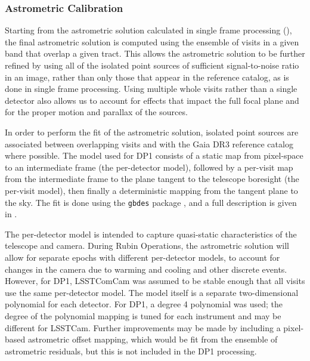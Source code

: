 \subsubsection{Astrometric Calibration}
\label{ssec:global_astrometric_calibration}
Starting from the astrometric solution calculated in single frame processing (), the final astrometric solution is computed using the ensemble of visits in a given band that overlap a given \gls{tract}.
This allows the astrometric solution to be further refined by using all of the isolated point sources of sufficient signal-to-noise ratio in an image, rather than only those that appear in the reference catalog, as is done in single frame processing.
Using multiple whole visits rather than a single detector also allows us to account for effects that impact the full focal plane and for the proper motion and parallax of the sources.

In order to perform the fit of the astrometric solution, isolated point sources are associated between overlapping visits and with the Gaia \gls{DR3} reference catalog where possible.
The model used for \gls{DP1} consists of a static map from pixel-space to an intermediate frame (the per-detector model), followed by a per-visit map from the intermediate frame to the plane tangent to the telescope boresight (the per-visit model), then finally a deterministic mapping from the tangent plane to the sky.
The fit is done using the \texttt{gbdes} package \citep{Bernstein2017}, and a full description is given in \citet{dmtn-266}.

The per-detector model is intended to capture quasi-static characteristics of the telescope and \gls{camera}.
During \gls{Rubin Operations}, the astrometric solution will allow for separate epochs with different per-detector models, to account for changes in the camera due to warming and cooling and other discrete events.
However, for \gls{DP1}, \gls{LSSTComCam} was assumed to be stable enough that all visits use the same per-detector model. The model itself is a separate two-dimensional polynomial for each detector.
For \gls{DP1}, a degree 4 polynomial was used; the degree of the polynomial mapping is tuned for each instrument and may be different for LSSTCam.
Further improvements may be made by including a pixel-based astrometric offset mapping, which would be fit from the ensemble of astrometric residuals, but this is not included in the \gls{DP1} processing.

